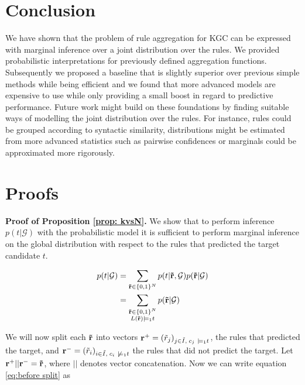 \documentclass{article}
\theoremstyle{plain}
\theoremstyle{remark}
\newcommand{\vecallrules}{\mathbf{\Tilde{r}}}
\newcommand{\oneruleassignment}{\Tilde{r}}
\newcommand{\alltriples}{\mathcal{G}}
\newcommand{\indexSetAll}{\Tilde{I}}
\begin{document}
\section{Conclusion}
We have shown that the problem of rule aggregation for KGC can be expressed with marginal inference over a joint distribution over the rules. We provided probabilistic interpretations for previously defined aggregation functions. Subsequently we proposed a baseline that is slightly superior over previous simple methods while being efficient and we found that more advanced models are expensive to use while only providing a small boost in regard to predictive performance. Future work might build on these foundations by finding suitable ways of modelling the joint distribution over the rules. For instance, rules could be grouped according to syntactic similarity, distributions might be estimated from more advanced statistics such as pairwise confidences or marginals could be approximated more rigorously. 

\cleardoublepage



\appendix
\section{Proofs}

\noindent \textbf{Proof of Proposition \ref{prop: kvsN}.} We show that to perform inference $p(t | \alltriples)$ with the probabilistic model it is sufficient to perform marginal inference on the global distribution with respect to the rules that predicted the target candidate $t$.

\begin{align}
    p(t | \alltriples)&=\sum_{\vecallrules \in \{0, 1\}^N} p(t | \vecallrules, \alltriples)p(\vecallrules | \alltriples) \\
     &=\sum\limits_{\substack{\vecallrules \in \{0, 1\}^N \\ L(\vecallrules) \models_1 t}} p(\vecallrules | \alltriples) \label{eq:before split}
\end{align}

\noindent We will now split each $\vecallrules$ into vectors $\mathbf{r}^+=(\oneruleassignment_j)_{\substack{j \in \indexSetAll, \; c_j\ \models_1 t}}$, the rules that predicted the target, and $\mathbf{r}^-=(\oneruleassignment_i)_{\substack{i \in \indexSetAll, \; c_i\ \not\models_1 t}}$ the rules that did not predict the target. Let $\mathbf{r}^+||\mathbf{r}^- = \vecallrules$, where $||$ denotes vector concatenation. Now we can write equation \eqref{eq:before split} as
\end{document}
